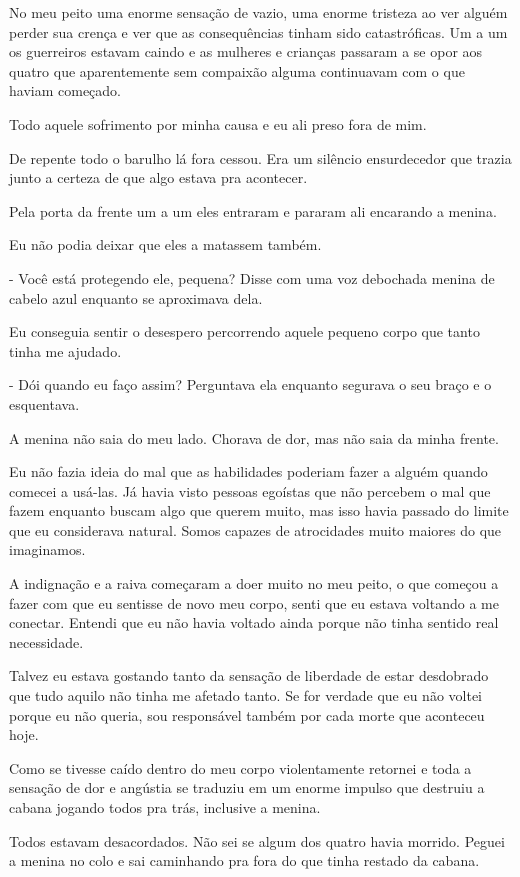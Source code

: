 No meu peito uma enorme sensação de vazio, uma enorme tristeza ao ver alguém perder sua crença e ver que as consequências tinham sido catastróficas. Um a um os guerreiros estavam caindo e as mulheres e crianças passaram a se opor aos quatro que aparentemente sem compaixão alguma continuavam com o que haviam começado.

Todo aquele sofrimento por minha causa e eu ali preso fora de mim.

De repente todo o barulho lá fora cessou. Era um silêncio ensurdecedor que trazia junto a certeza de que algo estava pra acontecer.

Pela porta da frente um a um eles entraram e pararam ali encarando a menina.

Eu não podia deixar que eles a matassem também.

- Você está protegendo ele, pequena? Disse com uma voz debochada menina de cabelo azul enquanto se aproximava dela.

Eu conseguia sentir o desespero percorrendo aquele pequeno corpo que tanto tinha me ajudado.

- Dói quando eu faço assim? Perguntava ela enquanto segurava o seu braço e o esquentava.

A menina não saia do meu lado. Chorava de dor, mas não saia da minha frente.

Eu não fazia ideia do mal que as habilidades poderiam fazer a alguém quando comecei a usá-las. Já havia visto pessoas egoístas que não percebem o mal que fazem enquanto buscam algo que querem muito, mas isso havia passado do limite que eu considerava natural. Somos capazes de atrocidades muito maiores do que imaginamos.

A indignação e a raiva começaram a doer muito no meu peito, o que começou a fazer com que eu sentisse de novo meu corpo, senti que eu estava voltando a me conectar. Entendi que eu não havia voltado ainda porque não tinha sentido real necessidade. 

Talvez eu estava gostando tanto da sensação de liberdade de estar desdobrado que tudo aquilo não tinha me afetado tanto. Se for verdade que eu não voltei porque eu não queria, sou responsável também por cada morte que aconteceu hoje.

Como se tivesse caído dentro do meu corpo violentamente retornei e toda a sensação de dor e angústia se traduziu em um enorme impulso que destruiu a cabana jogando todos pra trás, inclusive a menina.

Todos estavam desacordados. Não sei se algum dos quatro havia morrido. Peguei a menina no colo e sai caminhando pra fora do que tinha restado da cabana.

